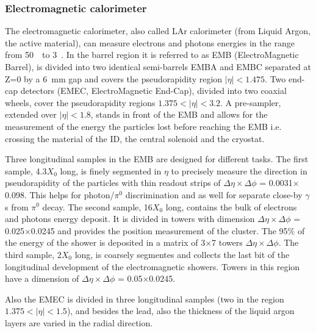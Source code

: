 \subsubsection{Electromagnetic calorimeter}\label{sec:emcalbarrel}

The electromagnetic calorimeter, also called LAr calorimeter (from Liquid Argon, the active material),
can measure electrons and photons energies in the range from 50~\mev\ to 3~\tev.
In the barrel region it is referred to as EMB (ElectroMagnetic Barrel), is 
divided into two identical semi-barrels EMBA and EMBC separated at Z=0 by a 6~mm
gap and covers the pseudorapidity region $|\eta|<1.475$. 
Two end-cap detectors (EMEC, ElectroMagnetic End-Cap), divided 
into two coaxial wheels, cover the pseudorapidity 
regions $1.375<|\eta|<3.2$. A pre-sampler, extended over 
$|\eta|<1.8$, stands in front of the EMB and allows for the measurement of
the energy the particles lost before reaching the EMB i.e. crossing the
material of the ID, the central solenoid and the cryostat.

Three longitudinal samples in the EMB are designed for different tasks. The first
sample, 4.3$X_0$ long, is finely segmented in $\eta$ to precisely measure
the direction in pseudorapidity of the particles with  thin readout strips
of $\Delta\eta\times\Delta\phi$ = 0.0031$\times$0.098. This helps for
photon/$\pi^{0}$ discrimination and as well for separate close-by $\gamma$s
from $\pi^{0}$ decay.
The second sample, 16$X_0$ long, contains the bulk of electrons and photons energy deposit. 
It is divided in towers with dimension $\Delta\eta\times\Delta\phi$ = 0.025$\times$0.0245
and provides the position measurement of the cluster. 
The  95\% of the energy of the shower is deposited in a matrix of 3$\times$7 
towers $\Delta\eta\times\Delta\phi$.
The third sample, 2$X_0$ long, is coarsely segmentes and collects the last bit of the longitudinal
development of the electromagnetic showers. Towers in this region have a dimension
of $\Delta\eta\times\Delta\phi$ = 0.05$\times$0.0245.

Also the EMEC is divided in three longitudinal samples (two in the region $1.375<|\eta|<1.5$),
and besides the lead, also the thickness of the liquid argon layers are varied in the
radial direction.

